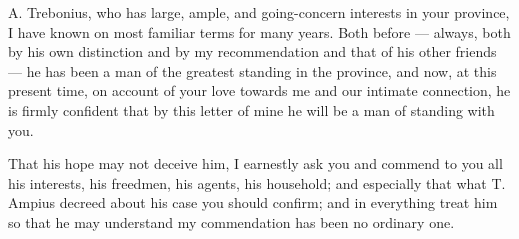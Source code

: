 

 A. Trebonius, who has large, ample, and going-concern interests in your province, I have known on most familiar terms for many years. Both before --- always, both by his own distinction and by my recommendation and that of his other friends --- he has been a man of the greatest standing in the province, and now, at this present time, on account of your love towards me and our intimate connection, he is firmly confident that by this letter of mine he will be a man of standing with you.

 That his hope may not deceive him, I earnestly ask you and commend to you all his interests, his freedmen, his agents, his household; and especially that what T. Ampius decreed about his case you should confirm; and in everything treat him so that he may understand my commendation has been no ordinary one.
